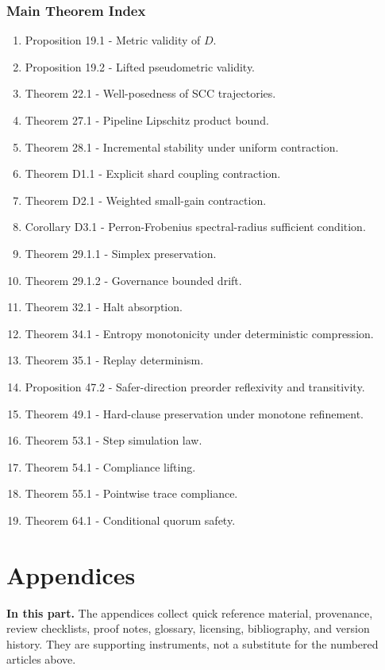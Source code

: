 \documentclass[10pt,oneside]{article}
\theoremstyle{definition}
\theoremstyle{remark}
\newcommand{\PartIntro}[1]{\noindent\textbf{In this part.} #1\par\medskip}
\begin{document}
\section*{Main Theorem Index}
\begin{enumerate}
  \item Proposition 19.1 - Metric validity of \(D\).
  \item Proposition 19.2 - Lifted pseudometric validity.
  \item Theorem 22.1 - Well-posedness of SCC trajectories.
  \item Theorem 27.1 - Pipeline Lipschitz product bound.
  \item Theorem 28.1 - Incremental stability under uniform contraction.
  \item Theorem D1.1 - Explicit shard coupling contraction.
  \item Theorem D2.1 - Weighted small-gain contraction.
  \item Corollary D3.1 - Perron-Frobenius spectral-radius sufficient condition.
  \item Theorem 29.1.1 - Simplex preservation.
  \item Theorem 29.1.2 - Governance bounded drift.
  \item Theorem 32.1 - Halt absorption.
  \item Theorem 34.1 - Entropy monotonicity under deterministic compression.
  \item Theorem 35.1 - Replay determinism.
  \item Proposition 47.2 - Safer-direction preorder reflexivity and transitivity.
  \item Theorem 49.1 - Hard-clause preservation under monotone refinement.
  \item Theorem 53.1 - Step simulation law.
  \item Theorem 54.1 - Compliance lifting.
  \item Theorem 55.1 - Pointwise trace compliance.
  \item Theorem 64.1 - Conditional quorum safety.
\end{enumerate}

\appendix
\part{Appendices}

\PartIntro{The appendices collect quick reference material, provenance, review checklists, proof notes, glossary, licensing, bibliography, and version history. They are supporting instruments, not a substitute for the numbered articles above.}
\end{document}
